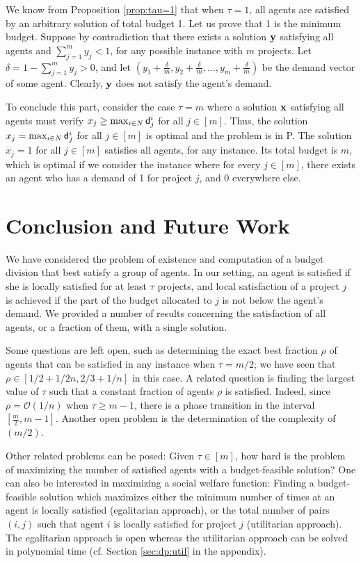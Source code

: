 \documentclass{article}
\begin{document}
We know from Proposition \ref{prop:tau=1} that when $\tau=1$, all agents are satisfied by an arbitrary solution of total budget 1. Let us prove that 1 is the minimum budget. Suppose by contradiction that there exists a solution ${\bf y}$ satisfying all agents and $\sum_{j=1}^m y_j <1$, for any possible instance with $m$ projects. Let $\delta=1-\sum_{j=1}^m y_j>0$, and let $(y_1+\frac{\delta}{m},y_2+\frac{\delta}{m},\ldots,y_m+\frac{\delta}{m})$ be the demand vector of some agent. Clearly, ${\bf y}$ does not satisfy the agent's demand. 
  





To conclude this part, consider the case $\tau=m$ where a solution ${\bf x}$ satisfying all agents must verify $x_j \ge \max_{i \in N} {\sf d}_j^i$ for all $j \in [m]$. Thus, the solution $x_j=\max_{i \in N} {\sf d}_j^i$ for all $j \in [m]$ is optimal and the problem is in P. The solution $x_j=1$ for all $j \in [m]$ satisfies all agents, for any instance. Its total budget is $m$, which is optimal if we consider the instance where for every $j\in [m]$, there exists an agent who has a demand of 1 for project $j$, and 0 everywhere else. 

\section{Conclusion and Future Work}

We have considered the problem of existence and computation of a budget division that best satisfy a group of agents. In our setting, an agent is satisfied if she is locally satisfied for at least $\tau$ projects, and local satisfaction of a project $j$ is achieved if the part of the budget allocated to $j$ is not below the agent's demand. We provided a number of results concerning the satisfaction of all agents, or a fraction of them, with a single solution.  

Some questions are left open, such as determining the exact best fraction $\rho$ of agents that can be satisfied in any instance when $\tau=m/2$; we have seen 
that $\rho \in [ 1/2+1/2n,2/3+1/n]$ in this case. A related question is finding the largest value of $\tau$ such that a constant fraction of agents $\rho$ is satisfied. Indeed, since $\rho = \mathcal{O}(1/n)$ when $\tau \geq m-1$, there is a phase transition in the interval $[\frac{m}{2},m-1]$.  
Another open problem 
is the determination of the complexity of \AAS$(m/2)$. 

Other related problems can be posed: Given $\tau \in [m]$, how hard is the problem of maximizing the number of satisfied agents with a budget-feasible solution? One can also be interested in maximizing a social welfare function: Finding a budget-feasible solution which maximizes either the minimum number of times at an agent is locally satisfied (egalitarian approach), or the total number of pairs $(i,j)$ such that agent $i$ is locally satisfied for project $j$ (utilitarian approach). The egalitarian approach is open whereas the utilitarian approach can be solved in polynomial time (cf. Section \ref{sec:dp:util} in the appendix).     
\end{document}
